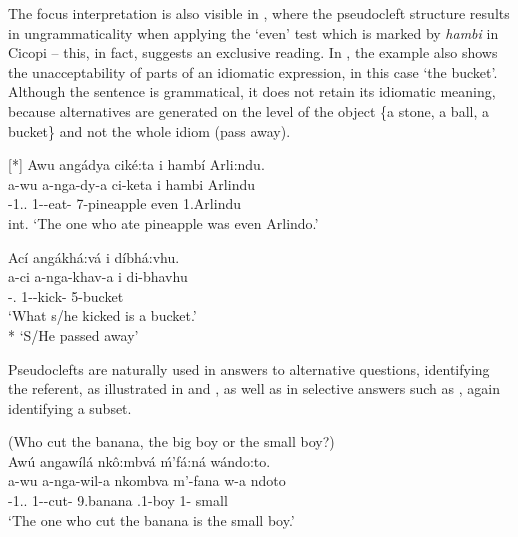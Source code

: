 \documentclass[output=paper]{langscibook}
\begin{document}
The focus interpretation is also visible in , where the pseudocleft structure results in ungrammaticality when applying the ‘even’ test which is marked by \textit{hambi} in Cicopi – this, in fact, suggests an exclusive reading. In , the example also shows the unacceptability of parts of an idiomatic expression, in this case ‘the bucket’. Although the sentence is grammatical, it does not retain its idiomatic meaning, because alternatives are generated on the level of the object \{a stone, a ball, a bucket\} and not the whole idiom (pass away).

\ea
[*]{
\label{bkm:Ref120696892}
Awu angádya ciké:ta i hambí Arli:ndu.\\
\gll
a-wu  a-nga-dy-a  ci-keta  i  hambi  Arlindu\\
\AUG{}-1.\DEM.\PROX{}  1\SM{}-\REL{}-eat-\FV{}  7-pineapple  \COP{}  even  1.Arlindu\\
\glt
int. ‘The one who ate pineapple was even Arlindo.’\\
}

 
\z

\ea
\label{bkm:Ref120696902}
Ací angákhá:vá i díbhá:vhu.\\
\gll
a-ci  a-nga-khav-a  i  di-bhavhu\\
\AUG{}-\DEM.\PROX{}  1\SM-\REL{}-kick-\FV{}  \COP{}  5-bucket\\
\glt
‘What s/he kicked is a bucket.’\\
* `S/He passed away’


\z

Pseudoclefts are naturally used in answers to alternative questions, identifying the referent, as illustrated in  and , as well as in selective answers such as , again identifying a subset.

\ea
\label{bkm:Ref120696808}
(Who cut the banana, the big boy or the small boy?)\\
Awú angawílá nkô:mbvá ḿ’fá:ná wándo:to.\\
\gll
a-wu  a-nga-wil-a  nkombva  m’-fana  w-a  ndoto\\
\AUG{}-1.\DEM{}.\PROX{}  1\SM{}-\REL{}-cut-\FV{}  9.banana  \COP{}.1-boy  1-\CONN{}  small\\
\glt
‘The one who cut the banana is the small boy.’\\
\end{document}

